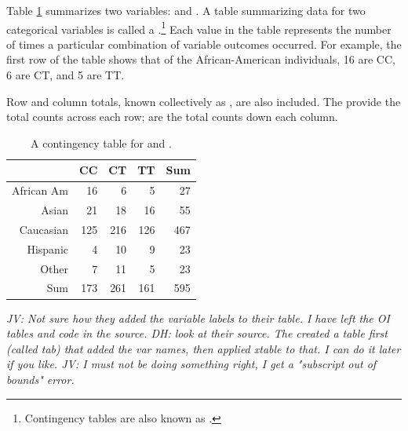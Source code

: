 Table \ref{famussContingencyTable} summarizes two variables:  and . A table summarizing data for two categorical variables is called a .\footnote{Contingency tables are also known as .} Each value in the table represents the number of times a particular combination of variable outcomes occurred. For example, the first row of the table shows that of the African-American individuals, 16 are CC, 6 are CT, and 5 are TT. 

Row and column totals, known collectively as , are also included. The  provide the total counts across each row;  are the total counts down each column.

\begin{table}[ht]
	\centering
	\begin{tabular}{rrrrr}
		\hline
		& CC & CT & TT & Sum \\ 
		\hline
		African Am & 16 & 6 & 5 & 27 \\ 
		Asian & 21 & 18 & 16 & 55 \\ 
		Caucasian & 125 & 216 & 126 & 467 \\ 
		Hispanic & 4 & 10 & 9 & 23 \\ 
		Other & 7 & 11 & 5 & 23 \\ 
		Sum & 173 & 261 & 161 & 595 \\ 
		\hline
	\end{tabular}
	\caption{A contingency table for  and .} 
	\label{famussContingencyTable}
\end{table}

\textit{JV: Not sure how they added the variable labels to their table. I have left the OI tables and code in the source.  DH: look at their source.  The created a table first (called tab) that added the var names, then applied xtable to that.  I can do it later if you like. JV: I must not be doing something right, I get a "subscript out of bounds" error.}

